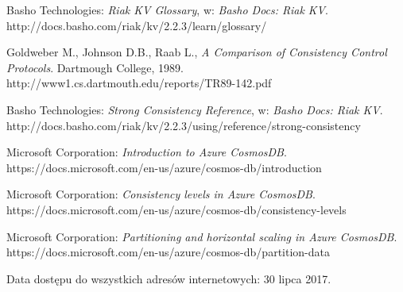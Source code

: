 \begin{thebibliography}{1}
 Basho Technologies: \textit{Riak KV Glossary}, w: \textit{Basho Docs: Riak KV}. \\
http://docs.basho.com/riak/kv/2.2.3/learn/glossary/

 Goldweber M., Johnson D.B., Raab L., \textit{A Comparison of Consistency Control Protocols}. Dartmough College, 1989. \\
http://www1.cs.dartmouth.edu/reports/TR89-142.pdf



 Basho Technologies: \textit{Strong Consistency Reference}, w: \textit{Basho Docs: Riak KV}. \\
http://docs.basho.com/riak/kv/2.2.3/using/reference/strong-consistency



 Microsoft Corporation: \textit{Introduction to Azure CosmosDB}. \\
https://docs.microsoft.com/en-us/azure/cosmos-db/introduction

 Microsoft Corporation: \textit{Consistency levels in Azure CosmosDB}. \\
https://docs.microsoft.com/en-us/azure/cosmos-db/consistency-levels

 Microsoft Corporation: \textit{Partitioning and horizontal scaling in Azure CosmosDB}. \\
https://docs.microsoft.com/en-us/azure/cosmos-db/partition-data

\end{thebibliography}
Data dostępu do wszystkich adresów internetowych: 30 lipca 2017.
